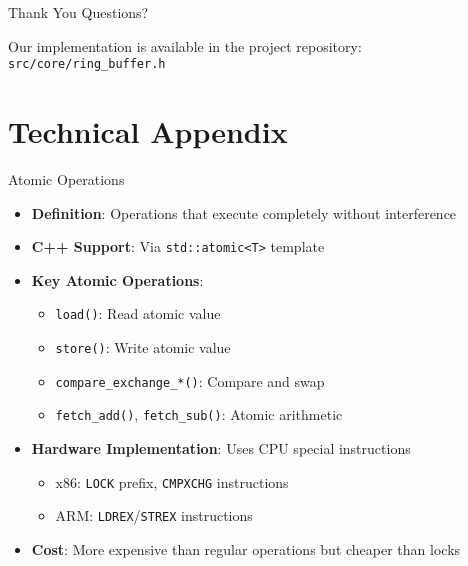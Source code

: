 \documentclass{beamer}
\begin{document}
\begin{frame}{Thank You}
\centering
\Huge{Questions?}

\vspace{1cm}
\normalsize
Our implementation is available in the project repository:\\
\texttt{src/core/ring\_buffer.h}
\end{frame}

\appendix
\section{Technical Appendix}

\begin{frame}{Atomic Operations}
\begin{itemize}
    \item \textbf{Definition}: Operations that execute completely without interference
    \item \textbf{C++ Support}: Via \texttt{std::atomic<T>} template
    \item \textbf{Key Atomic Operations}:
    \begin{itemize}
        \item \texttt{load()}: Read atomic value
        \item \texttt{store()}: Write atomic value
        \item \texttt{compare\_exchange\_*()}: Compare and swap
        \item \texttt{fetch\_add()}, \texttt{fetch\_sub()}: Atomic arithmetic
    \end{itemize}
    \item \textbf{Hardware Implementation}: Uses CPU special instructions
    \begin{itemize}
        \item x86: \texttt{LOCK} prefix, \texttt{CMPXCHG} instructions
        \item ARM: \texttt{LDREX}/\texttt{STREX} instructions
    \end{itemize}
    \item \textbf{Cost}: More expensive than regular operations but cheaper than locks
\end{itemize}
\end{frame}
\end{document}
